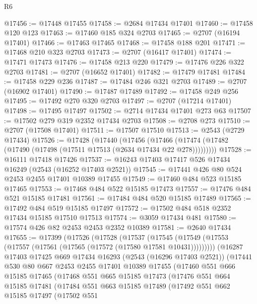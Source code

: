 \begin{lexlean}{R6}
\begin{coremodule}
@17456 := @17448 @17455
@17458 := @2684 @17434 @17401
@17460 := @17458 @120 @123
@17463 := @17460 @185 @324 @2703
@17465 := @2707 (@16194 @17401)
@17466 := @17463 @17465
@17468 := @17458 @188 @201
@17471 := @17468 @210 @323 @2703
@17473 := @2707 (@16417 @17401)
@17474 := @17471 @17473
@17476 := @17458 @213 @220
@17479 := @17476 @226 @322 @2703
@17481 := @2707 (@16652 @17401)
@17482 := @17479 @17481
@17484 := @17458 @229 @236
@17487 := @17484 @246 @321 @2703
@17489 := @2707 (@16902 @17401)
@17490 := @17487 @17489
@17492 := @17458 @249 @256
@17495 := @17492 @270 @320 @2703
@17497 := @2707 (@17214 @17401)
@17498 := @17495 @17497
@17502 := @2714 @17434 @17401 @273 @63
@17507 := @17502 @279 @319 @2352 @17434 @2703
@17508 := @2708 @273
@17510 := @2707 (@17508 @17401)
@17511 := @17507 @17510
@17513 := @2543 (@2729 @17434)
@17526 := @17428
    (@17440
      (@17456 (@17466 (@17474 (@17482 (@17490 (@17498 (@17511 @17513 (@2634 @17434 @22 @278)))))))))
@17528 := @16111 @17418 @17426
@17537 := @16243 @17403 @17417 @526 @17434 @16249 (@2543 (@16252 @17403 @2521))
@17545 := @17441 @426 @80 @524 @2453 @2455 @17401 @10389 @17455
@17549 := @17460 @484 @523 @15185 @17465
@17553 := @17468 @484 @522 @15185 @17473
@17557 := @17476 @484 @521 @15185 @17481
@17561 := @17484 @484 @520 @15185 @17489
@17565 := @17492 @484 @519 @15185 @17497
@17572 := @17502 @484 @518 @2352 @17434 @15185 @17510 @17513
@17574 := @3059 @17434 @481
@17580 := @17574 @426 @82 @2453 @2453 @2352 @10389
@17581 := @2640 @17434
@17655 := @17399
    (@17526
      (@17528
        (@17537
          (@17545 (@17549 (@17553 (@17557 (@17561 (@17565 (@17572 (@17580 @17581 @10431)))))))))
        (@16287
          @17403
          @17425
          @669
          @17434
          @16293
          (@2543 (@16296 @17403 @2521))
          (@17441
            @530
            @80
            @667
            @2453
            @2455
            @17401
            @10389
            @17455
            (@17460
              @551
              @666
              @15185
              @17465
              (@17468
                @551
                @665
                @15185
                @17473
                (@17476
                  @551
                  @664
                  @15185
                  @17481
                  (@17484
                    @551
                    @663
                    @15185
                    @17489
                    (@17492
                      @551
                      @662
                      @15185
                      @17497
                      (@17502
                        @551

\end{coremodule}
\end{lexlean}
